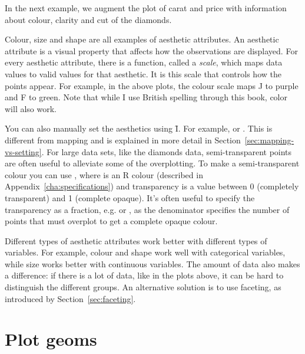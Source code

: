 In the next example, we augment the plot of carat and price with information about colour, clarity and cut of the diamonds.

% 


Colour, size and shape are all examples of aesthetic attributes.  An aesthetic attribute is a visual property that affects how the observations are displayed.  For every aesthetic attribute, there is a function, called a \emph{scale}, which maps data values to valid values for that aesthetic.  It is this scale that controls how the points appear.  For example, in the above plots, the colour scale maps J to purple and F to green.  Note that while I use British spelling through this book, color will also work.

You can also manually set the aesthetics using \f{I}.  For example,  or .  This is different from mapping and is explained in more detail in Section~\ref{sec:mapping-vs-setting}.  For large data sets, like the diamonds data, semi-transparent points are often useful to alleviate some of the overplotting.  To make a semi-transparent colour you can use , where  is an R colour (described in Appendix~\ref{cha:specifications}) and transparency is a value between 0 (completely transparent) and 1 (complete opaque).  It's often useful to specify the transparency as a fraction, e.g.  or , as the denominator specifies the number of points that must overplot to get a complete opaque colour.

Different types of aesthetic attributes work better with different types of variables.  For example, colour and shape work well with categorical variables, while size works better with continuous variables.  The amount of data also makes a difference: if there is a lot of data, like in the plots above, it can be hard to distinguish the different groups.  An alternative solution is to use faceting, as introduced by Section~\ref{sec:faceting}.

\section{Plot geoms}\label{sec:plot_geoms}

